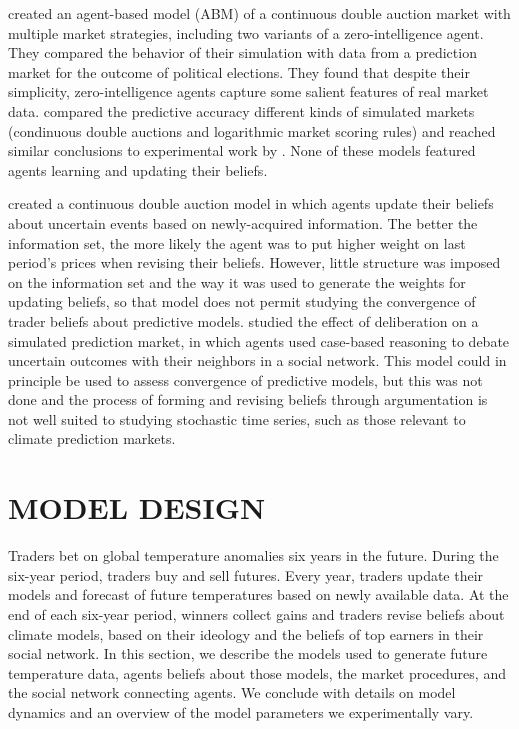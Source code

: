 \documentclass{wscpaperproc}\usepackage[]{graphicx}\usepackage[]{color}
\begin{document}
 created an agent-based model (ABM) of a continuous double auction market with multiple market strategies, including two variants of a zero-intelligence agent. They compared the behavior of their simulation with data from a prediction market for the outcome of political elections. They found that despite their simplicity, zero-intelligence agents capture some salient features of real market data.  compared the predictive accuracy different kinds of simulated markets (condinuous double auctions and logarithmic market scoring rules) and reached similar conclusions to experimental work by . None of these models featured agents learning and updating their beliefs.

 created a continuous double auction model in which agents update their beliefs about uncertain events based on newly-acquired information. The better the information set, the more likely the agent was to put higher weight on last period's prices when revising their beliefs. However, little structure was imposed on the information set and the way it was used to generate the weights for updating beliefs, so that model does not permit studying the convergence of trader beliefs about predictive models.  studied the effect of deliberation on a simulated prediction market, in which agents used case-based reasoning  to debate uncertain outcomes with their neighbors in a social network. This model could in principle be used to assess convergence of predictive models, but this was not done and the process of forming and revising beliefs through argumentation is not well suited to studying stochastic time series, such as those relevant to climate prediction markets.

\section{MODEL DESIGN}

Traders bet on global temperature anomalies six years in the future. 
During the six-year period, traders buy and sell futures. 
Every year, traders update their models and forecast of future temperatures based on newly available data. 
At the end of each six-year period, winners collect gains and traders revise beliefs about climate models, based on their ideology and the beliefs of top earners in their social network. 
In this section, we describe the models used to generate future temperature data, agents beliefs about those models, the market procedures, and the social network connecting agents. 
We conclude with details on model dynamics and an overview of the model parameters we experimentally vary.
\end{document}
